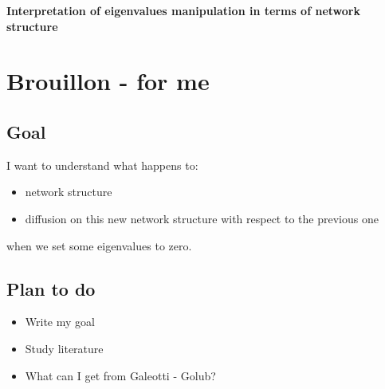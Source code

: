 \documentclass[12pt]{article}
\begin{document}
\begin{center}
\textbf{Interpretation of eigenvalues manipulation in terms of network structure}
\end{center}

\tableofcontents


\section{Brouillon - for me}

\subsection{Goal}
I want to understand what happens to:
\begin{itemize}[noitemsep,topsep=0pt]
  \item network structure
  \item diffusion on this new network structure with respect to the previous one
 \end{itemize}

when we set some eigenvalues to zero.
\subsection{Plan to do}
\begin{itemize}[noitemsep,topsep=0pt]
\item Write my goal
\item Study literature
\item What can I get from Galeotti - Golub?
\end{itemize}
\end{document}
